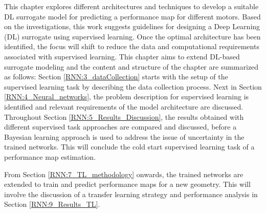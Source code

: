 This chapter explores different architectures and techniques to develop a suitable DL surrogate model for predicting a performance map for different motors. Based on the investigations, this work suggests guidelines for designing a Deep Learning (DL) surrogate using supervised learning. Once the optimal architecture has been identified, the focus will shift to reduce the data and computational requirements associated with supervised learning. 
This chapter aims to extend DL-based surrogate modeling and the content and structure of the chapter are summarized as follows: Section \ref{RNN:3_dataCollection} starts with the setup of the supervised learning task by describing the data collection process. Next in Section \ref{RNN:4_Neural_networks}, the problem description for supervised learning is identified and relevant requirements of the model architecture are discussed. Throughout Section \ref{RNN:5_Results_Discussion}, the results obtained with different supervised task approaches are compared and discussed, before a Bayesian learning approach is used to address the issue of uncertainty in the trained networks. This will conclude the cold start supervised learning task of a performance map estimation. 

From Section \ref{RNN:7_TL_methodology} onwards, the trained networks are extended to train and predict performance maps for a new geometry. This will involve the discussion of a transfer learning strategy and performance analysis in Section \ref{RNN:9_Results_TL}. 

